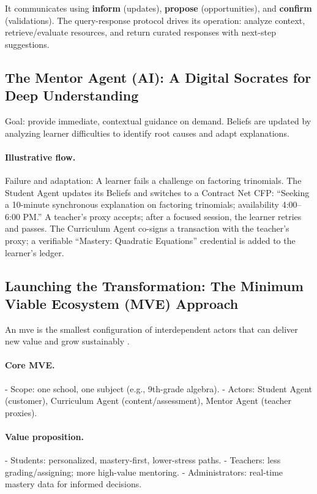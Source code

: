 \documentclass[12pt,a4paper]{article}
\begin{document}
It communicates using \textbf{inform} (updates), \textbf{propose} (opportunities), and \textbf{confirm} (validations). The query-response protocol drives its operation: analyze context, retrieve/evaluate resources, and return curated responses with next-step suggestions.

\subsection{The Mentor Agent (AI): A Digital Socrates for Deep Understanding}
Goal: provide immediate, contextual guidance on demand. Beliefs are updated by analyzing learner difficulties to identify root causes and adapt explanations.

\paragraph{Illustrative flow.}
Failure and adaptation: A learner fails a challenge on factoring trinomials. The Student Agent updates its Beliefs and switches to a Contract Net CFP: \enquote{Seeking a 10-minute synchronous explanation on factoring trinomials; availability 4:00–6:00 PM.} A teacher’s proxy accepts; after a focused session, the learner retries and passes. The Curriculum Agent co-signs a transaction with the teacher’s proxy; a verifiable \enquote{Mastery: Quadratic Equations} credential is added to the learner’s ledger.

\subsection{Launching the Transformation: The Minimum Viable Ecosystem (MVE) Approach}
An \gls{mve} is the smallest configuration of interdependent actors that can deliver new value and grow sustainably \autocite{adner2023,adner2023_2,msg_advisors,audi_weihe}.

\paragraph{Core MVE.}
- Scope: one school, one subject (e.g., 9th-grade algebra).
- Actors: Student Agent (customer), Curriculum Agent (content/assessment), Mentor Agent (teacher proxies).

\paragraph{Value proposition.}
- Students: personalized, mastery-first, lower-stress paths.
- Teachers: less grading/assigning; more high-value mentoring.
- Administrators: real-time mastery data for informed decisions.
\end{document}
